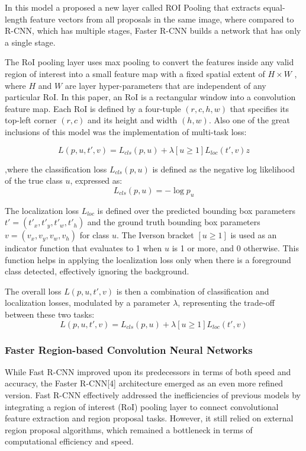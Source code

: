 In this model a proposed a new layer called ROI Pooling that extracts equal-length feature vectors from all proposals in the same image, where 
compared to R-CNN, which has multiple stages, Faster R-CNN builds a network that has only a single stage. 

The RoI pooling layer uses max pooling to convert the features inside any valid region of interest into a small feature map with a fixed spatial 
extent of \(H \times W\) , where $H$ and $W$ are layer hyper-parameters that are independent of any particular RoI. In this paper, an RoI is a rectangular window 
into a convolution feature map. Each RoI is defined by a four-tuple \((r, c, h, w)\) that specifies its top-left corner \((r, c)\) and its height 
and width \((h, w)\). Also one of the great inclusions of this model was the implementation of multi-task loss:

\[L(p, u, t', v) = L_{cls}(p, u) + \lambda [u \geq 1] L_{loc}(t', v)z\]

,where the classification loss \(L_{cls}(p, u)\) is defined as the negative log likelihood of the true class \(u\), expressed as:
\[
L_{cls}(p, u) = -\log p_u
\]

The localization loss \(L_{loc}\) is defined over the predicted bounding box parameters \(t' = (t'_x, t'_y, t'_w, t'_h)\) and the ground truth bounding 
box parameters \(v = (v_x, v_y, v_w, v_h)\) for class \(u\). The Iverson bracket \([u \geq 1]\) is used as an indicator function that evaluates to 1 
when \(u\) is 1 or more, and 0 otherwise. This function helps in applying the localization loss only when there is a foreground class detected, 
effectively ignoring the background.

The overall loss \(L(p, u, t', v)\) is then a combination of classification and localization losses, modulated by a parameter \(\lambda\), representing the trade-off between these two tasks:
\[
L(p, u, t', v) = L_{cls}(p, u) + \lambda [u \geq 1] L_{loc}(t', v)
\]

\newpage
\subsubsection{Faster Region-based Convolution Neural Networks}

While Fast R-CNN improved upon its predecessors in terms of both speed and accuracy, the Faster R-CNN[4] architecture emerged as an even more refined version. 
Fast R-CNN effectively addressed the inefficiencies of previous models by integrating a region of interest (RoI) pooling layer to connect convolutional 
feature extraction and region proposal tasks. However, it still relied on external region proposal algorithms, which remained a bottleneck in terms of 
computational efficiency and speed. 

